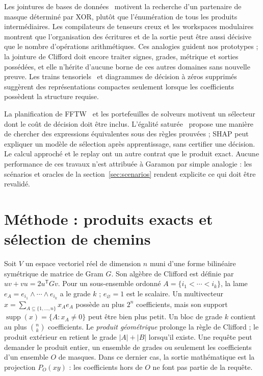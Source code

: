 \documentclass[11pt,a4paper]{article}
\newcommand{\supp}{\operatorname{supp}}
\begin{document}
Les jointures de bases de données~\cite{leapfrog} motivent la recherche
d'un partenaire de masque déterminé par XOR, plutôt que l'énumération de
tous les produits intermédiaires. Les compilateurs de tenseurs creux
\cite{taco,finch,galley} et les workspaces modulaires
\cite{sparseworkspace} montrent que l'organisation des écritures et de la
sortie peut être aussi décisive que le nombre d'opérations arithmétiques.
Ces analogies guident nos prototypes ; la jointure de Clifford doit encore
traiter signes, grades, métrique et sorties possédées, et elle n'hérite
d'aucune borne de ces autres domaines sans nouvelle preuve. Les trains
tensoriels~\cite{oseledets} et diagrammes de décision à zéros supprimés
\cite{minato} suggèrent des représentations compactes seulement lorsque
les coefficients possèdent la structure requise.

La planification de FFTW~\cite{fftw} et les portefeuilles de solveurs
\cite{satzilla,autofolio} motivent un sélecteur dont le coût de décision
doit être inclus. L'égalité saturée~\cite{egg} propose une manière de
chercher des expressions équivalentes sous des règles prouvées ; SHAP
\cite{shap} peut expliquer un modèle de sélection après apprentissage,
sans certifier une décision. Le calcul approché et le replay ont un autre
contrat que le produit exact. Aucune performance de ces travaux n'est
attribuée à Garamon par simple analogie : les scénarios et oracles de la
section~\ref{sec:scenarios} rendent explicite ce qui doit être revalidé.

\section{Méthode : produits exacts et sélection de chemins}
Soit $V$ un espace vectoriel réel de dimension $n$ muni d'une forme
bilinéaire symétrique de matrice de Gram $G$. Son algèbre de Clifford est
définie par $uv+vu=2u^{\mathsf T}Gv$. Pour un sous-ensemble ordonné
$A=\{i_1<\cdots<i_k\}$, la lame $e_A=e_{i_1}\wedge\cdots\wedge e_{i_k}$
a le grade $k$ ; $e_{\varnothing}=1$ est le scalaire. Un multivecteur
$x=\sum_{A\subseteq\{1,\ldots,n\}}x_Ae_A$ possède au plus $2^n$
coefficients, mais son support $\supp(x)=\{A:x_A\ne0\}$ peut être bien
plus petit. Un bloc de grade $k$ contient au plus $\binom nk$ coefficients.
Le \emph{produit géométrique} prolonge la règle de Clifford ; le produit
extérieur en retient le grade $|A|+|B|$ lorsqu'il existe. Une requête
peut demander le produit entier, un ensemble de grades ou seulement les
coefficients d'un ensemble $O$ de masques. Dans ce dernier cas, la sortie
mathématique est la projection $P_O(xy)$ : les coefficients hors de $O$
ne font pas partie de la requête.
\end{document}
